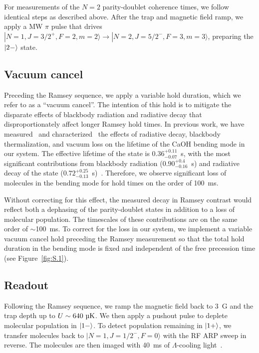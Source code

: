 \documentclass[
superscriptaddress,
twocolumn,
amsmath,amssymb,
aps,
prx,
nofootinbib,
]{revtex4-2}
\begin{document}
For measurements of the $N=2$ parity-doublet coherence times, we follow identical steps as described above. After the trap and magnetic field ramp, we apply a MW $\pi$ pulse that drives $|N=1, J=3/2^+,F=2,m=2\rangle\rightarrow |N=2,J=5/2^-,F=3,m=3\rangle$, preparing the $\ket{2-}$ state.

\subsection{Vacuum cancel}
Preceding the Ramsey sequence, we apply a variable hold duration, which we refer to as a ``vacuum cancel''. The intention of this hold is to mitigate the disparate effects of blackbody radiation and radiative decay that disproportionately affect longer Ramsey hold times. In previous work, we have measured~\cite{hallas2022optical} and characterized~\cite{vilas2023blackbody} the effects of radiative decay, blackbody thermalization, and vacuum loss on the lifetime of the CaOH bending mode in our system. The effective lifetime of the state is $0.36_{-0.07}^{+0.11}$~s, with the most significant contributions from blackbody radiation ($0.90_{-0.16}^{+0.4}$~s) and radiative decay of the state ($0.72_{-0.13}^{+0.25}$~s)~\cite{hallas2022optical,vilas2023blackbody}. Therefore, we observe significant loss of molecules in the bending mode for hold times on the order of 100~ms.

Without correcting for this effect, the measured decay in Ramsey contrast would reflect both a dephasing of the parity-doublet states in addition to a loss of molecular population. The timescales of these contributions are on the same order of $\sim$100~ms. To correct for the loss in our system, we implement a variable vacuum cancel hold preceding the Ramsey measurement so that the total hold duration in the bending mode is fixed and independent of the free precession time (see Figure~\ref{fig:S.1}).


\subsection{Readout}
Following the Ramsey sequence, we ramp the magnetic field back to 3~G and the trap depth up to $U\sim640~\text{\textmu K}$. We then apply a pushout pulse to deplete molecular population in $\ket{1-}$. To detect population remaining in $\ket{1+}$, we transfer molecules back to $|N=1, J=1/2^-,F=0\rangle$ with the RF ARP sweep in reverse. The molecules are then imaged with 40~ms of $\Lambda$-cooling light~\cite{hallas2022optical}.
\end{document}
